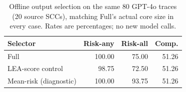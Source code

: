 \begin{table}[t]
\centering
\small
\caption{Offline output selection on the same 80 GPT-4o traces (20 source SCCs), matching Full's actual core size in every case. Rates are percentages; no new model calls.}
\label{tab:offline_selector_control}
\begin{tabular}{lrrr}
\toprule
Selector & Risk-any & Risk-all & Comp. \\
\midrule
Full & 100.00 & 75.00 & 51.26 \\
LEA-score control & 98.75 & 72.50 & 51.26 \\
Mean-risk (diagnostic) & 100.00 & 93.75 & 51.26 \\
\bottomrule
\end{tabular}
\end{table}
